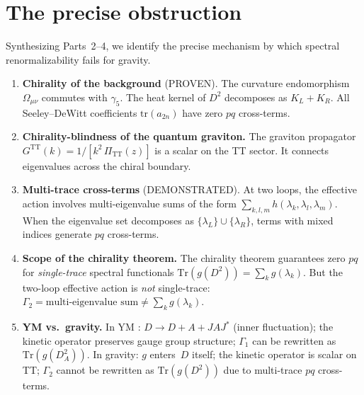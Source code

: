 \documentclass[11pt,a4paper]{article}
\newcommand{\PiTT}{\Pi_{\mathrm{TT}}}
\newcommand{\Tr}{\mathrm{Tr}}
\newcommand{\tr}{\mathrm{tr}}
\theoremstyle{definition}
\begin{document}
\section{The precise obstruction}\label{sec:obstruction}

Synthesizing Parts~2--4, we identify the precise mechanism by which spectral
renormalizability fails for gravity.

\begin{enumerate}[label=\textbf{\arabic*.}]
\item \textbf{Chirality of the background} (\textcolor{proven}{PROVEN}).
  The curvature endomorphism $\Omega_{\mu\nu}$ commutes with $\gamma_5$.
  The heat kernel of $D^2$ decomposes as $K_L + K_R$.  All Seeley--DeWitt
  coefficients $\tr(a_{2n})$ have zero $pq$ cross-terms.

\item \textbf{Chirality-blindness of the quantum graviton.}
  The graviton propagator $G^{\mathrm{TT}}(k) = 1/[k^2\,\PiTT(z)]$ is a
  scalar on the TT sector.  It connects eigenvalues across the chiral boundary.

\item \textbf{Multi-trace cross-terms} (\textcolor{disproven}{DEMONSTRATED}).
  At two loops, the effective action involves multi-eigenvalue sums of the form
  $\sum_{k,l,m} h(\lambda_k, \lambda_l, \lambda_m)$.  When the eigenvalue set
  decomposes as $\{\lambda_L\} \cup \{\lambda_R\}$, terms with mixed indices
  generate $pq$ cross-terms.

\item \textbf{Scope of the chirality theorem.}
  The chirality theorem guarantees zero $pq$ for \emph{single-trace} spectral
  functionals $\Tr(g(D^2)) = \sum_k g(\lambda_k)$.  But the two-loop effective
  action is \emph{not} single-trace:
  $\Gamma_2 = \text{multi-eigenvalue sum} \neq \sum_k g(\lambda_k)$.

\item \textbf{YM vs.\ gravity.}
  In YM \cite{vS2011}: $D \to D + A + JAJ^*$ (inner fluctuation); the
  kinetic operator preserves gauge group structure; $\Gamma_1$ can be rewritten
  as $\Tr(g(D_A^2))$.
  In gravity: $g$ enters~$D$ itself; the kinetic operator is scalar on TT;
  $\Gamma_2$ cannot be rewritten as $\Tr(g(D^2))$ due to multi-trace $pq$
  cross-terms.
\end{enumerate}
\end{document}
